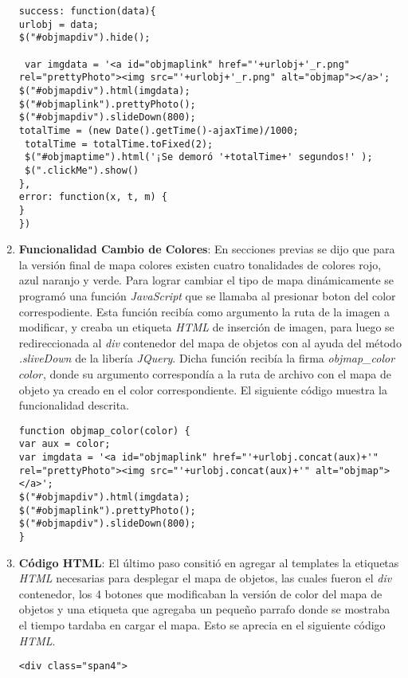 \begin{enumerate}[label=\alph*) ,font=\bfseries]
\begin{lstlisting}[style=Java, caption={Función de despligue del Mapa de Objetos.}]
success: function(data){
urlobj = data;
$("#objmapdiv").hide();
  
 var imgdata = '<a id="objmaplink" href="'+urlobj+'_r.png" rel="prettyPhoto"><img src="'+urlobj+'_r.png" alt="objmap"></a>';
$("#objmapdiv").html(imgdata);
$("#objmaplink").prettyPhoto();
$("#objmapdiv").slideDown(800);
totalTime = (new Date().getTime()-ajaxTime)/1000;
 totalTime = totalTime.toFixed(2);
 $("#objmaptime").html('¡Se demoró '+totalTime+' segundos!' );
 $(".clickMe").show()
},
error: function(x, t, m) {
}
})
\end{lstlisting}
\item \textbf{Funcionalidad Cambio de Colores}: En secciones previas se dijo que para la versión 
final de mapa colores existen cuatro tonalidades de colores rojo, azul naranjo y verde. Para lograr
cambiar el tipo de mapa dinámicamente se programó una función \textit{JavaScript} que se llamaba al presionar boton del color correspodiente. Esta función recibía como argumento la ruta de la imagen
a modificar, y creaba un etiqueta \textit{HTML} de inserción de imagen, para luego se redireccionada
al \textit{div} contenedor del mapa de objetos con al ayuda del método \textit{.sliveDown\(\)} de la
libería \textit{JQuery}. Dicha función recibía la firma \textit{objmap_color\(color\)}, donde su 
argumento correspondía a la ruta de archivo con el mapa de objeto ya creado en el color 
correspondiente. El siguiente código muestra la funcionalidad descrita.
\newpage
\begin{lstlisting}[style=Java, caption={Función que genera el cambio de colors en el Mapa de Obejtos.}]
function objmap_color(color) {
var aux = color;      
var imgdata = '<a id="objmaplink" href="'+urlobj.concat(aux)+'" rel="prettyPhoto"><img src="'+urlobj.concat(aux)+'" alt="objmap"></a>';
$("#objmapdiv").html(imgdata);
$("#objmaplink").prettyPhoto();
$("#objmapdiv").slideDown(800);
}
\end{lstlisting}
\item \textbf{Código HTML}: El último paso consitió en agregar al templates la etiquetas 
\textit{HTML} necesarias para desplegar el mapa de objetos, las cuales fueron el \textit{div}
contenedor, los 4 botones que modificaban la versión de color del mapa de objetos y una 
etiqueta que agregaba un pequeño parrafo donde se mostraba el tiempo tardaba en cargar el mapa.
Esto se aprecia en el siguiente código \textit{HTML}.
\begin{lstlisting}[style=Java, caption={Contenido \textit{HTML} donde se aloja el Mapa de Objetos.}]
<div class="span4">

\end{lstlisting}
\end{enumerate}
